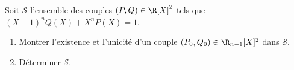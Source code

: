 \begin{enonce}
\begin{exercise}[ID={RMS134 E1384},subtitle={IMT MP
    2023},theme={algebre},concours={mines-telecom},annee={2023}]
  Soit $\mathcal{S}$ l'ensemble des couples $(P,Q)\in\R[X]^2$ tels que $(X-1)^nQ(X)+X^nP(X)=1$.
  \begin{enumerate}
  \item Montrer l'existence et l'unicité d'un couple
    $(P_0,Q_0)\in\R_{n-1}[X]^2$ dans $\mathcal{S}$.
  \item Déterminer $\mathcal{S}$.
  \end{enumerate}
\end{exercise}
\end{enonce}